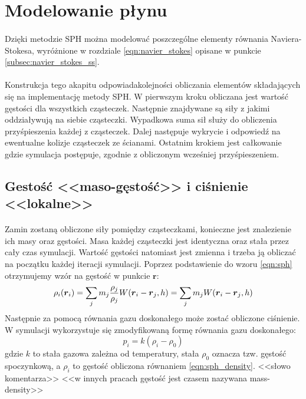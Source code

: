 \newpage

\section{Modelowanie płynu}

\paragraph{}
Dzięki metodzie SPH można modelować poszczególne elementy równania Naviera-Stokesa, wyróżnione w rozdziale \eqref{eqn:navier_stokes} opisane w punkcie \eqref{subsec:navier_stokes_ss}.
\par
\paragraph{}
\indent Konstrukcja tego akapitu odpowiadakolejności obliczania elementów składających się na implementację metody SPH. W pierwszym kroku obliczana jest wartość gęstości dla wszystkich cząsteczek. Następnie znajdywane są siły z jakimi oddziaływują na siebie cząsteczki. Wypadkowa suma sił służy do obliczenia przyśpieszenia każdej z cząsteczek. Dalej następuje wykrycie i odpowiedź na ewentualne kolizje cząsteczek ze ścianami. Ostatnim krokiem jest całkowanie gdzie symulacja postępuje, zgodnie z obliczonym wcześniej przyśpieszeniem.
\par

\subsection{Gestość <<maso-gęstość>> i ciśnienie <<lokalne>>}

\paragraph{}
Zamin zostaną obliczone siły pomiędzy cząsteczkami, konieczne jest znalezienie ich masy oraz gęstości. Masa każdej cząsteczki jest identyczna oraz stała przez cały czas symulacji. Wartość gęstości natomiast jest zmienna i trzeba ją obliczać na początku każdej iteracji symulacji. Poprzez podstawienie do wzoru \eqref{eqn:sph} otrzymujemy wzór na gęstość w punkcie $\boldsymbol{r}$:
\begin{equation}
\rho_i(\boldsymbol{r}_i) = \sum\limits_{j} m_j {\rho_j \over\rho_j}W(\boldsymbol{r}_i-\boldsymbol{r}_j, h) = \sum\limits_{j} m_j W(\boldsymbol{r}_i-\boldsymbol{r}_j, h)
\label{eqn:sph_density}
\end{equation}
Następnie za pomocą równania gazu doskonałego może zostać obliczone ciśnienie. W symulacji wykorzystuje się zmodyfikowaną formę równania gazu doskonałego:
\begin{equation}
p_i = k(\rho_i - \rho_0)
\label{eqn:sph_desbrun_pressure}
\end{equation}
gdzie $k$ to stała gazowa zależna od temperatury, stała $\rho_0$ oznacza tzw. gęstość spoczynkową, a $\rho_i$ to gęstość obliczona równaniem \eqref{eqn:sph_density}. <<słowo komentarza>> <<w innych pracach gęstość jest czasem nazywana mass-density>>
\par


